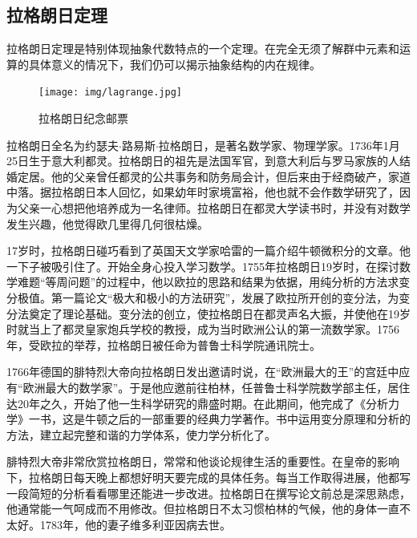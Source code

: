 \documentclass[b5paper]{ctexart}
\begin{document}
\subsection{拉格朗日定理}

拉格朗日定理是特别体现抽象代数特点的一个定理。在完全无须了解群中元素和运算的具体意义的情况下，我们仍可以揭示抽象结构的内在规律。

\begin{figure}
 \centering
 \texttt{[image: img/lagrange.jpg]}
 \captionsetup{labelformat=empty}
 \caption{拉格朗日纪念邮票}
 \label{fig:Lagrange}
\end{figure}

拉格朗日全名为约瑟夫$\cdot$路易斯$\cdot$拉格朗日，是著名数学家、物理学家。1736年1月25日生于意大利都灵。拉格朗日的祖先是法国军官，到意大利后与罗马家族的人结婚定居。他的父亲曾任都灵的公共事务和防务局会计，但后来由于经商破产，家道中落。据拉格朗日本人回忆，如果幼年时家境富裕，他也就不会作数学研究了，因为父亲一心想把他培养成为一名律师。拉格朗日在都灵大学读书时，并没有对数学发生兴趣，他觉得欧几里得几何很枯燥。

17岁时，拉格朗日碰巧看到了英国天文学家哈雷的一篇介绍牛顿微积分的文章。他一下子被吸引住了。开始全身心投入学习数学。1755年拉格朗日19岁时，在探讨数学难题“等周问题”的过程中，他以欧拉的思路和结果为依据，用纯分析的方法求变分极值。第一篇论文“极大和极小的方法研究”，发展了欧拉所开创的变分法，为变分法奠定了理论基础。变分法的创立，使拉格朗日在都灵声名大振，并使他在19岁时就当上了都灵皇家炮兵学校的教授，成为当时欧洲公认的第一流数学家。1756年，受欧拉的举荐，拉格朗日被任命为普鲁士科学院通讯院士。

1766年德国的腓特烈大帝向拉格朗日发出邀请时说，在“欧洲最大的王”的宫廷中应有“欧洲最大的数学家”。于是他应邀前往柏林，任普鲁士科学院数学部主任，居住达20年之久，开始了他一生科学研究的鼎盛时期。在此期间，他完成了《分析力学》一书，这是牛顿之后的一部重要的经典力学著作。书中运用变分原理和分析的方法，建立起完整和谐的力学体系，使力学分析化了。

腓特烈大帝非常欣赏拉格朗日，常常和他谈论规律生活的重要性。在皇帝的影响下，拉格朗日每天晚上都想好明天要完成的具体任务。每当工作取得进展，他都写一段简短的分析看看哪里还能进一步改进。拉格朗日在撰写论文前总是深思熟虑，他通常能一气呵成而不用修改。但拉格朗日不太习惯柏林的气候，他的身体一直不太好。1783年，他的妻子维多利亚因病去世。
\end{document}
